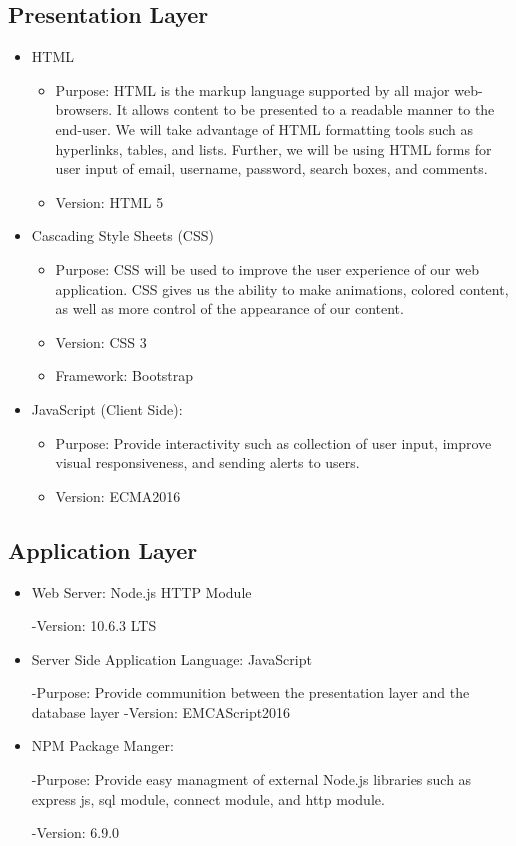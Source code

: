 \documentclass[letter, 12pt, titlepage]{article}
\begin{document}
			\subsection{Presentation Layer}
			\begin{itemize}
			 \item HTML
				\begin{itemize}
					\item Purpose: HTML is the markup language supported by all major web-browsers. It allows content to be presented to a readable manner to the end-user. We will take advantage of HTML formatting tools such as hyperlinks, tables, and lists. Further, we will be using HTML forms for user input of email, username, password, search boxes, and comments.
					\item Version: HTML 5
				\end{itemize}
			\item Cascading Style Sheets (CSS)
			\begin{itemize}	
				\item Purpose: CSS will be used to improve the user experience of our web application. CSS gives us the ability to make animations, colored content, as well as more control of the appearance of our content.
				\item Version: CSS 3
				\item Framework: Bootstrap
			\end{itemize}
			\item	JavaScript (Client Side):
				\begin{itemize}
					\item	Purpose: Provide interactivity such as collection of user input, improve visual responsiveness, and sending alerts to users.
					\item Version: ECMA2016
				\end{itemize}
			\end{itemize}

		\subsection{Application Layer}
		\begin{itemize}
			\item Web Server: Node.js HTTP Module
			
				-Version: 10.6.3 LTS
			
			\item Server Side Application Language: JavaScript
				
				-Purpose: Provide communition between the presentation layer and the database layer
				-Version: EMCAScript2016

			\item	NPM Package Manger:

				-Purpose: Provide easy managment of external Node.js libraries such as express js, sql module, connect module, and http module.

				-Version: 6.9.0 
		\end{itemize}	
\end{document}
